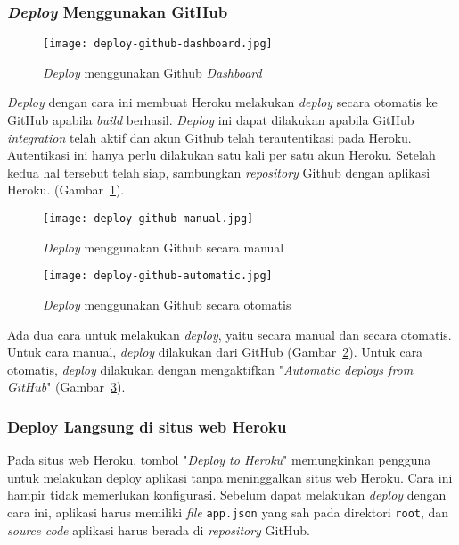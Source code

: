 \subsubsection{\textit{Deploy} Menggunakan GitHub}
\begin{figure}[H]
	\centering  
	\texttt{[image: deploy-github-dashboard.jpg]}  
	\caption[\textit{Deploy} menggunakan Github \textit{Dashboard}]{\textit{Deploy} menggunakan Github \textit{Dashboard}} 
	\label{fig:deploy-github-dashboard} 
\end{figure}
\textit{Deploy} dengan cara ini membuat Heroku melakukan \textit{deploy} secara otomatis ke GitHub apabila \textit{build} berhasil. \textit{Deploy} ini dapat dilakukan apabila GitHub \textit{integration} telah aktif dan akun Github telah terautentikasi pada Heroku. Autentikasi ini hanya perlu dilakukan satu kali per satu akun Heroku. Setelah kedua hal tersebut telah siap, sambungkan \textit{repository} Github dengan aplikasi Heroku. (Gambar~\ref{fig:deploy-github-dashboard}).

\begin{figure}[H]
	\centering  
	\texttt{[image: deploy-github-manual.jpg]}  
	\caption[\textit{Deploy} menggunakan Github secara manual]{\textit{Deploy} menggunakan Github secara manual} 
	\label{fig:deploy-github-manual} 
\end{figure}
\begin{figure}[H]
	\centering  
	\texttt{[image: deploy-github-automatic.jpg]}  
	\caption[\textit{Deploy} menggunakan Github secara otomatis]{\textit{Deploy} menggunakan Github secara otomatis} 
	\label{fig:deploy-github-automatic} 
\end{figure}
Ada dua cara untuk melakukan \textit{deploy}, yaitu secara manual dan secara otomatis. Untuk cara manual, \textit{deploy} dilakukan dari GitHub (Gambar~\ref{fig:deploy-github-manual}). Untuk cara otomatis, \textit{deploy} dilakukan dengan mengaktifkan "\textit{Automatic deploys from GitHub}" (Gambar~\ref{fig:deploy-github-automatic}).

\subsubsection{Deploy Langsung di situs web Heroku}
Pada situs web Heroku, tombol "\textit{Deploy to Heroku}" memungkinkan pengguna untuk melakukan deploy aplikasi tanpa meninggalkan situs web Heroku. Cara ini hampir tidak memerlukan konfigurasi. Sebelum dapat melakukan \textit{deploy} dengan cara ini, aplikasi harus memiliki \textit{file} \texttt{app.json} yang sah pada direktori \texttt{root}, dan \textit{source code} aplikasi harus berada di \textit{repository} GitHub.

